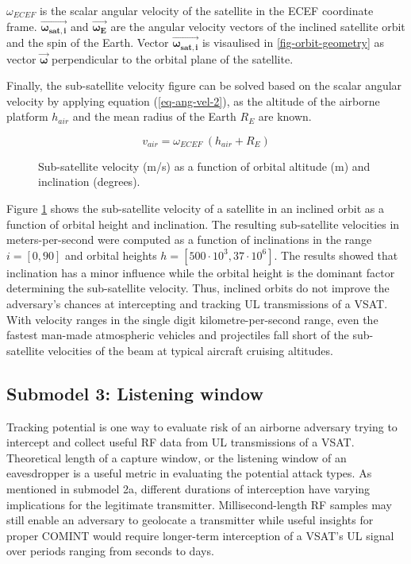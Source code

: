 \documentclass[english, 12pt, a4paper, elec, utf8, a-1b, online]{aaltothesis}
\begin{document}
$\omega_{ECEF}$ is the scalar angular velocity of the satellite in the ECEF coordinate frame.
$\bm{\vec{\omega_{sat, i}}}$ and $\bm{\vec{\omega_{E}}}$ are the angular velocity vectors of the inclined satellite orbit and the spin of the Earth. Vector $\bm{\vec{\omega_{sat, i}}}$ is visaulised in \ref{fig-orbit-geometry} as vector $\bm{\vec{\omega}}$ perpendicular to the orbital plane of the satellite.

Finally, the sub-satellite velocity figure can be solved based on the scalar angular velocity by applying equation (\ref{eq-ang-vel-2}), as the altitude of the airborne platform $h_{air}$ and the mean radius of the Earth $R_E$ are known.

\begin{equation}
  v_{air} = \omega_{ECEF}\ (h_{air} + R_E)
\end{equation}

\begin{figure}[h]
  \centering
  
  \caption{Sub-satellite velocity (m/s) as a function of orbital altitude (m) and inclination (degrees).}
  \label{fig-subsat-velocity-inclined}
\end{figure}
Figure \ref{fig-subsat-velocity-inclined} shows the sub-satellite velocity of a satellite in an inclined orbit as a function of orbital height and inclination.
The resulting sub-satellite velocities in meters-per-second were computed as a function of inclinations in the range $i = [0,90]$ and orbital heights $h = [500 \cdot 10^3, 37 \cdot 10^6]$.
The results showed that inclination has a minor influence while the orbital height is the dominant factor determining the sub-satellite velocity.
Thus, inclined orbits do not improve the adversary's chances at intercepting and tracking UL transmissions of a VSAT.
With velocity ranges in the single digit kilometre-per-second range, even the fastest man-made atmospheric vehicles and projectiles fall short of the sub-satellite velocities of the beam at typical aircraft cruising altitudes.

\subsection{Submodel 3: Listening window} \label{ch-results-submodel-3-window}
Tracking potential is one way to evaluate risk of an airborne adversary trying to intercept and collect useful RF data from UL transmissions of a VSAT.
Theoretical length of a capture window, or the listening window of an eavesdropper is a useful metric in evaluating the potential attack types.
As mentioned in submodel 2a, different durations of interception have varying implications for the legitimate transmitter.
Millisecond-length RF samples may still enable an adversary to geolocate a transmitter while useful insights for proper COMINT would require longer-term interception of a VSAT's UL signal over periods ranging from seconds to days.
\end{document}
